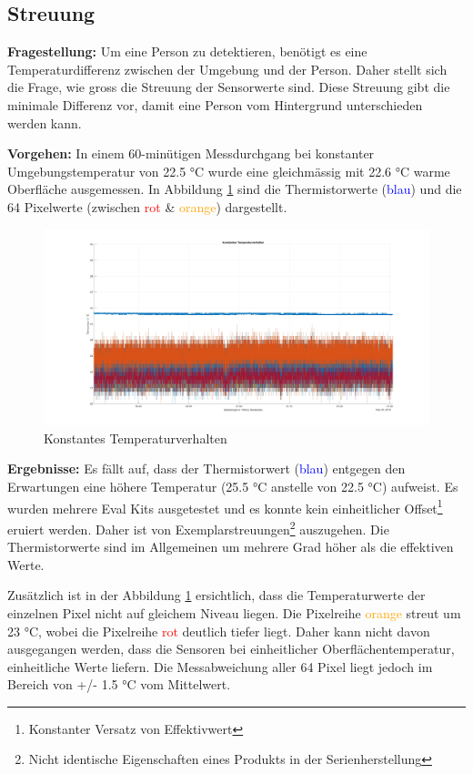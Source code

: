 \subsection{Streuung}

\textbf{Fragestellung:} Um eine Person zu detektieren, benötigt es eine Temperaturdifferenz zwischen der Umgebung und der Person. Daher stellt sich die Frage, wie gross die Streuung der Sensorwerte sind. Diese Streuung gibt die minimale Differenz vor, damit eine Person vom Hintergrund unterschieden werden kann.

\textbf{Vorgehen:} In einem 60-minütigen Messdurchgang bei konstanter Umgebungstemperatur von 22.5 °C wurde eine gleichmässig mit 22.6 °C warme Oberfläche ausgemessen. In Abbildung \ref{fig:temperaturverhalten} sind die Thermistorwerte (\textcolor{blue}{blau}) und die 64 Pixelwerte (zwischen \textcolor{red}{rot} \& \textcolor{orange}{orange}) dargestellt.
\begin{figure}[H]
	\centering
	\includegraphics[width=1.0\textwidth]{fig/Temperaturverhalten}
	\caption[Konstantes Temperaturverhalten]{Konstantes Temperaturverhalten}
	\label{fig:temperaturverhalten}
\end{figure}

\textbf{Ergebnisse:} Es fällt auf, dass  der Thermistorwert (\textcolor{blue}{blau}) entgegen den Erwartungen eine höhere Temperatur (25.5 °C anstelle von 22.5 °C) aufweist. Es wurden mehrere Eval Kits ausgetestet und es konnte kein einheitlicher Offset\footnote[14]{Konstanter Versatz von Effektivwert} eruiert werden. Daher ist von Exemplarstreuungen\footnote[15]{Nicht identische Eigenschaften eines Produkts in der Serienherstellung} auszugehen. Die Thermistorwerte sind im Allgemeinen um mehrere Grad höher als die effektiven Werte. 

Zusätzlich ist in der Abbildung \ref{fig:temperaturverhalten} ersichtlich, dass die Temperaturwerte der einzelnen Pixel nicht auf gleichem Niveau liegen. Die Pixelreihe \textcolor{orange}{orange} streut um 23 °C, wobei die Pixelreihe \textcolor{red}{rot} deutlich tiefer liegt. Daher kann nicht davon ausgegangen werden, dass die Sensoren bei einheitlicher Oberflächentemperatur, einheitliche Werte liefern. Die Messabweichung aller 64 Pixel liegt jedoch im Bereich von +/- 1.5 °C vom Mittelwert. 

